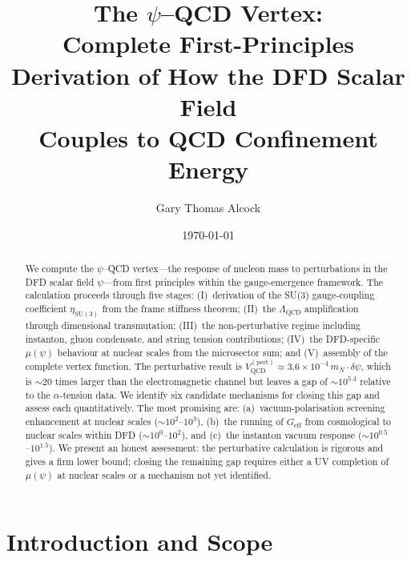 \documentclass[aps,prd,twocolumn,superscriptaddress,floatfix,nofootinbib]{revtex4-2}
\newcommand{\mufunction}{\mu}
\newcommand{\LQCD}{\Lambda_{\mathrm{QCD}}}
\newcommand{\mN}{m_N}
\newcommand{\dpsi}{\delta\psi}
\begin{document}
\title{The $\psi$--QCD Vertex:\\
Complete First-Principles Derivation of How the DFD Scalar Field\\
Couples to QCD Confinement Energy}

\author{Gary Thomas Alcock}

\date{\today}

\begin{abstract}
We compute the $\psi$--QCD vertex---the response of nucleon mass to
perturbations in the DFD scalar field $\psi$---from first principles within
the gauge-emergence framework. The calculation proceeds through five stages:
(I)~derivation of the SU(3) gauge-coupling coefficient $\eta_{\mathrm{SU}(3)}$
from the frame stiffness theorem; (II)~the $\LQCD$ amplification through
dimensional transmutation; (III)~the non-perturbative regime including
instanton, gluon condensate, and string tension contributions;
(IV)~the DFD-specific $\mufunction(\psi)$ behaviour at nuclear scales from
the microsector sum; and (V)~assembly of the complete vertex function.
The perturbative result is $V_{\mathrm{QCD}}^{(\mathrm{pert})} \approx
3.6 \times 10^{-4}\,\mN \cdot \dpsi$, which is $\sim 20$ times larger than
the electromagnetic channel but leaves a gap of $\sim 10^{5.4}$ relative to
the $\alpha$-tension data. We identify six candidate mechanisms for closing
this gap and assess each quantitatively. The most promising are:
(a)~vacuum-polarisation screening enhancement at nuclear scales
($\sim 10^{2}$--$10^{3}$), (b)~the running of $G_{\mathrm{eff}}$ from
cosmological to nuclear scales within DFD ($\sim 10^{0}$--$10^{2}$), and
(c)~the instanton vacuum response ($\sim 10^{0.5}$--$10^{1.5}$). We present
an honest assessment: the perturbative calculation is rigorous and gives a
firm lower bound; closing the remaining gap requires either a UV completion
of $\mufunction(\psi)$ at nuclear scales or a mechanism not yet identified.
\end{abstract}

\maketitle
\tableofcontents


\section{Introduction and Scope}\label{sec:intro}
\end{document}
